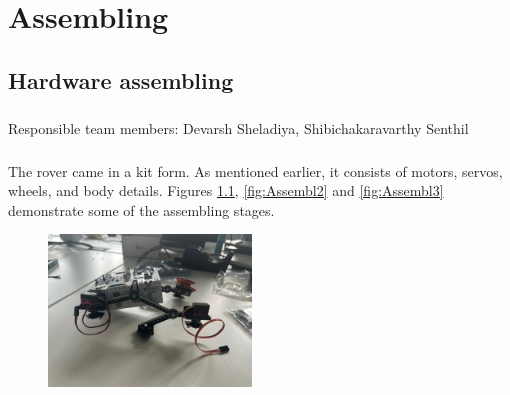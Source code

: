 \chapter{Assembling}
\section{Hardware assembling}
\paragraph{} Responsible team members: Devarsh Sheladiya, Shibichakaravarthy Senthil

\paragraph{} The rover came in a kit form. As mentioned earlier, it consists of motors, servos, wheels, and body details. Figures \ref{fig:Assembl1}, \ref{fig:Assembl2} and \ref{fig:Assembl3} demonstrate some of the assembling stages.


\begin{figure}[ht]
    \vspace{0.4cm}
    \centering
    \includegraphics[width=0.48\textwidth]{Hauptkapitel/Pictures/As1.jpg}
    \caption{}
    \label{fig:Assembl1}
\end{figure}

